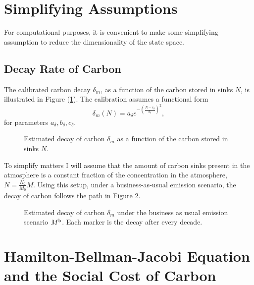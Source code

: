 \documentclass[../../main.tex]{subfiles}
\begin{document}
\section{Simplifying Assumptions} \label{appendix:assumptions}

For computational purposes, it is convenient to make some simplifying assumption to reduce the dimensionality of the state space.

\subsection{Decay Rate of Carbon}
 
The calibrated carbon decay $\delta_m$, as a function of the carbon stored in sinks $N$, is illustrated in Figure (\ref{fig:decay}). The calibration assumes a functional form \begin{equation}
    \delta_m(N) = a_{\delta} e^{-\left(\frac{N - c_{\delta}}{b_{\delta}}\right)^2},
\end{equation} for parameters $a_{\delta}, b_{\delta}, c_{\delta}$.

\begin{figure}[H]
    \centering
    \caption{Estimated decay of carbon $\delta_m$ as a  function of the carbon stored in sinks $N$.}
    \label{fig:decay}
\end{figure}

To simplify matters I will assume that the amount of carbon sinks present in the atmosphere is a constant fraction of the concentration in the atmosphere, $N = \frac{N_0}{M_0} M$. Using this setup, under a business-as-usual emission scenario, the decay of carbon follows the path in Figure \ref{fig:decaypath}.

\begin{figure}[H]
    \centering
    \caption{Estimated decay of carbon $\delta_m$ under the business as usual emission scenario $M^{\mathrm{b}}$. Each marker is the decay after every decade.}
    \label{fig:decaypath}
\end{figure}

\iffalse
\section{Hamilton-Bellman-Jacobi Equation and the Social Cost of Carbon} \label{appendix:hjb}
\end{document}
